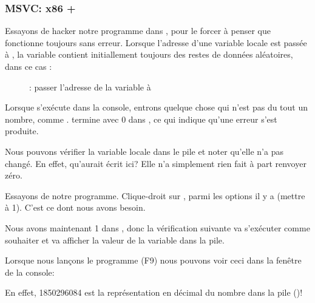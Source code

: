 \clearpage
\subsubsection{MSVC: x86 + \olly}

Essayons de hacker notre programme dans \olly, pour le forcer à penser que \scanf
fonctionne toujours sans erreur.
Lorsque l'adresse d'une variable locale est passée à \scanf, la variable contient
initiallement toujours des restes de données aléatoires, dans ce cas :

\begin{figure}[H]
\centering
{}
\caption{\olly: passer l'adresse de la variable à \scanf}
\label{fig:scanf_ex3_olly_1}
\end{figure}

\clearpage
Lorsque \scanf s'exécute dans la console, entrons quelque chose qui n'est pas du
tout un nombre, comme .
\scanf termine avec 0 dans \EAX, ce qui indique qu'une erreur s'est produite.

Nous pouvons vérifier la variable locale dans le pile et noter qu'elle n'a pas changé.
En effet, qu'aurait écrit \scanf ici?
Elle n'a simplement rien fait à part renvoyer zéro.

Essayons de  notre programme.
Clique-droit sur \EAX,
parmi les options il y a  (mettre à 1).
C'est ce dont nous avons besoin.

Nous avons maintenant 1 dans \EAX, donc la vérification suivante va s'exécuter comme
souhaiter et \printf va afficher la valeur de la variable dans la pile.

Lorsque nous lançons le programme (F9) nous pouvons voir ceci dans la fenêtre
de la console:



En effet, 1850296084 est la représentation en décimal du nombre dans la pile ()!
